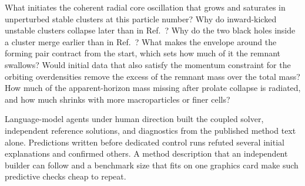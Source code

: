 What initiates the coherent radial core oscillation that grows and saturates in unperturbed stable clusters at this particle number? Why do inward-kicked unstable clusters collapse later than in Ref.~\cite{Wu:2026nrpic}? Why do the two black holes inside a cluster merge earlier than in Ref.~\cite{Wu:2026nrpic}? What makes the envelope around the forming pair contract from the start, which sets how much of it the remnant swallows? Would initial data that also satisfy the momentum constraint for the orbiting overdensities remove the excess of the remnant mass over the total mass? How much of the apparent-horizon mass missing after prolate collapse is radiated, and how much shrinks with more macroparticles or finer cells?

Language-model agents under human direction built the coupled solver, independent reference solutions, and diagnostics from the published method text alone. Predictions written before dedicated control runs refuted several initial explanations and confirmed others. A method description that an independent builder can follow and a benchmark size that fits on one graphics card make such predictive checks cheap to repeat.
